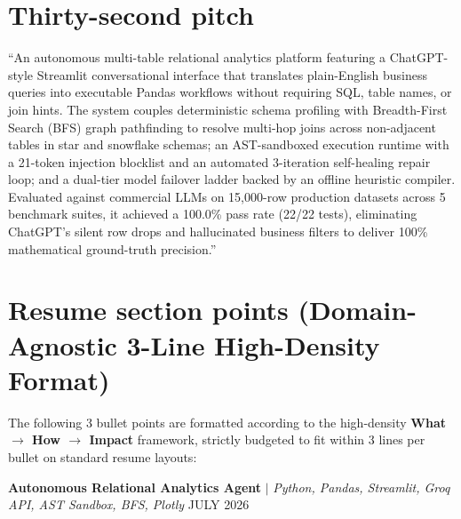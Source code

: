 \documentclass[11pt,a4paper]{article}
\begin{document}
\section{Thirty-second pitch}
``An autonomous multi-table relational analytics platform featuring a ChatGPT-style Streamlit conversational interface that translates plain-English business queries into executable Pandas workflows without requiring SQL, table names, or join hints. The system couples deterministic schema profiling with Breadth-First Search (BFS) graph pathfinding to resolve multi-hop joins across non-adjacent tables in star and snowflake schemas; an AST-sandboxed execution runtime with a 21-token injection blocklist and an automated 3-iteration self-healing repair loop; and a dual-tier model failover ladder backed by an offline heuristic compiler. Evaluated against commercial LLMs on 15,000-row production datasets across 5 benchmark suites, it achieved a 100.0\% pass rate (22/22 tests), eliminating ChatGPT's silent row drops and hallucinated business filters to deliver 100\% mathematical ground-truth precision.''

\newpage
\section{Resume section points (Domain-Agnostic 3-Line High-Density Format)}

The following 3 bullet points are formatted according to the high-density \textbf{What $\rightarrow$ How $\rightarrow$ Impact} framework, strictly budgeted to fit within 3 lines per bullet on standard resume layouts:

\vspace{0.3cm}
\noindent\textbf{Autonomous Relational Analytics Agent} $|$ \emph{Python, Pandas, Streamlit, Groq API, AST Sandbox, BFS, Plotly} \hfill JULY 2026
\end{document}
